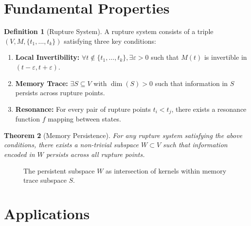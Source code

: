 \documentclass[12pt]{article}
\theoremstyle{plain}
\newtheorem{theorem}{Theorem}
\theoremstyle{definition}
\newtheorem{definition}[theorem]{Definition}
\begin{document}
\section{Fundamental Properties}

\begin{definition}[Rupture System]
A rupture system consists of a triple $(V, M, \{t_1,\ldots,t_k\})$ satisfying three key conditions:
\begin{enumerate}
    \item \textbf{Local Invertibility:} $\forall t\notin\{t_1,\ldots,t_k\}, \exists \varepsilon > 0$ such that $M(t)$ is invertible in $(t-\varepsilon,t+\varepsilon)$.
    \item \textbf{Memory Trace:} $\exists S \subseteq V$ with $\dim(S) > 0$ such that information in $S$ persists across rupture points.
    \item \textbf{Resonance:} For every pair of rupture points $t_i < t_j$, there exists a resonance function $f$ mapping between states.
\end{enumerate}
\end{definition}

\begin{theorem}[Memory Persistence]
For any rupture system satisfying the above conditions, there exists a non-trivial subspace $W \subset V$ such that information encoded in $W$ persists across all rupture points.
\end{theorem}

\begin{figure}[h]
\centering
{}
\caption{The persistent subspace $W$ as intersection of kernels within memory trace subspace $S$.}
\end{figure}

\section{Applications}
\end{document}
